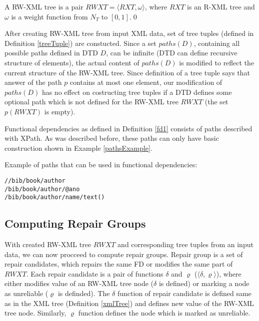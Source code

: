 \begin{define}
A RW-XML tree is a pair $RWXT = \langle RXT, \omega \rangle$, where $RXT$ is an R-XML tree and $\omega$ is a weight function from $N_T$ to $[0,1]$.\qed
\end{define}

After creating RW-XML tree from input XML data, set of tree tuples (defined in Definition \ref{treeTuple}) are constucted. Since a set $paths(D)$, containing all possible paths defined in DTD $D$, can be infinite (DTD can define recursive structure of elements), the actual content of $paths(D)$ is modified to reflect the current structure of the RW-XML tree. Since definition of a tree tuple says that answer of the path $p$ contains at most one element, our modification of $paths(D)$ has no effect on costructing tree tuples if a DTD defines some optional path which is not defined for the RW-XML tree $RWXT$ (the set $p(RWXT)$ is empty).

Functional dependencies as defined in Definition \ref{fd1} consists of paths described with XPath. As was described before, these paths can only have basic construction shown in Example \ref{pathsExample}.

\begin{example}\label{pathsExample}
Example of paths that can be used in functional dependencies:
\begin{verbatim}
//bib/book/author
/bib/book/author/@ano
/bib/book/author/name/text()
\end{verbatim}
\end{example}

\subsection{Computing Repair Groups}

With created RW-XML tree $RWXT$ and corresponding tree tuples from an input data, we can now procceed to compute repair groups. Repair group is a set of repair candidates, which repairs the same FD or modifies the same part of $RWXT$. Each repair candidate is a pair of functions $\delta$ and $\varrho$ ($\langle \delta, \varrho \rangle$), where either modifies value of an RW-XML tree node ($\delta$ is defined) or marking a node as unreliable ($\varrho$ is definded). The $\delta$ function of repair candidate is defined same as in the XML tree (Definition \ref{xmlTree}) and defines new value of the RW-XML tree node. Similarly, $\varrho$ function defines the node which is marked as unreliable.

